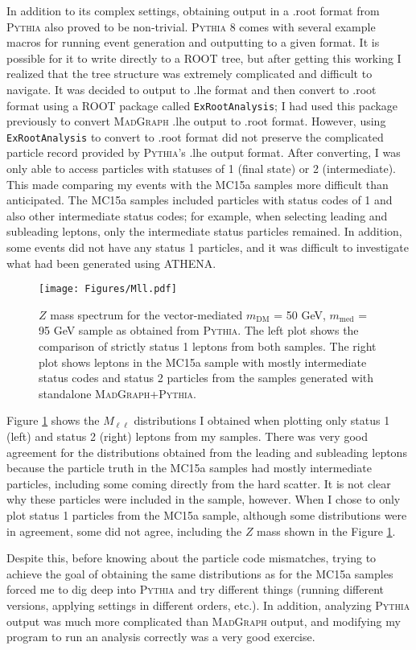 In addition to its complex settings, obtaining output in a .root format from \textsc{Pythia} also proved to be non-trivial. \textsc{Pythia} 8 comes with several example macros for running event generation and outputting to a given format. It is possible for it to write directly to a ROOT tree, but after getting this working I realized that the tree structure was extremely complicated and difficult to navigate. It was decided to output to .lhe format and then convert to .root format using a ROOT package called \texttt{ExRootAnalysis}; I had used this package previously to convert \textsc{MadGraph} .lhe output to .root format. However, using \texttt{ExRootAnalysis} to convert to .root format did not preserve the complicated particle record provided by \textsc{Pythia}'s .lhe output format. After converting, I was only able to access particles with statuses of 1 (final state) or 2 (intermediate). This made comparing my events with the MC15a samples more difficult than anticipated. The MC15a samples included particles with status codes of 1 and also other intermediate status codes; for example, when selecting leading and subleading leptons, only the intermediate status particles remained. In addition, some events did not have any status 1 particles, and it was difficult to investigate what had been generated using ATHENA.

\begin{figure}[h]
\centering
\texttt{[image: Figures/Mll.pdf]}
\caption[$Z$ mass spectrum for the vector-mediated $m_{\text{DM}}$ = 50 GeV, $m_{\text{med}}$ = 95 GeV sample as obtained from \textsc{Pythia}]{$Z$ mass spectrum for the vector-mediated $m_{\text{DM}}$ = 50 GeV, $m_{\text{med}}$ = 95 GeV sample as obtained from \textsc{Pythia}. The left plot shows the comparison of strictly status 1 leptons from both samples. The right plot shows leptons in the MC15a sample with mostly intermediate status codes and status 2 particles from the samples generated with standalone \textsc{MadGraph}+\textsc{Pythia}.}
\label{fig:Mll}
\end{figure}

Figure \ref{fig:Mll} shows the $M_{\ell\ell}$ distributions I obtained when plotting only status 1 (left) and status 2 (right) leptons from my samples. There was very good agreement for the distributions obtained from the leading and subleading leptons because the particle truth in the MC15a samples had mostly intermediate particles, including some coming directly from the hard scatter. It is not clear why these particles were included in the sample, however. When I chose to only plot status 1 particles from the MC15a sample, although some distributions were in agreement, some did not agree, including the $Z$ mass shown in the Figure \ref{fig:Mll}.

Despite this, before knowing about the particle code mismatches, trying to achieve the goal of obtaining the same distributions as for the MC15a samples forced me to dig deep into \textsc{Pythia} and try different things (running different versions, applying settings in different orders, etc.). In addition, analyzing \textsc{Pythia} output was much more complicated than \textsc{MadGraph} output, and modifying my program to run an analysis correctly was a very good exercise. 
